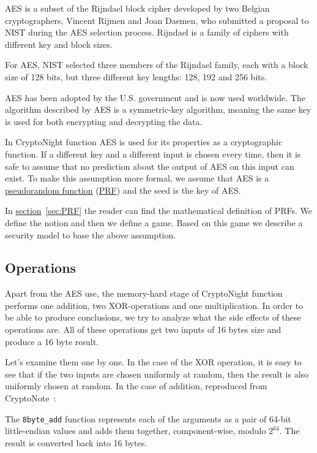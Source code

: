 AES is a subset of the Rijndael block cipher developed by two Belgian cryptographers, Vincent Rijmen and Joan Daemen, who submitted a proposal to NIST during the AES selection process. Rijndael is a family of ciphers with different key and block sizes.

For AES, NIST selected three members of the Rijndael family, each with a block size of 128 bits, but three different key lengths: 128, 192 and 256 bits.

AES has been adopted by the U.S. government and is now used worldwide. The algorithm described by AES is a symmetric-key algorithm, meaning the same key is used for both encrypting and decrypting the data.

In CryptoNight function AES is used for its properties as a cryptographic function. If a different key and a different input is chosen every time, then it is safe to assume that no prediction about the output of AES on this input can exist. To make this assumption more formal, we assume that AES is a \hyperref[sec:PRF]{pseudorandom function} (\hyperref[sec:PRF]{PRF}) and the seed is the key of AES.

In \hyperref[sec:PRF]{section}~\ref{sec:PRF} the reader can find the mathematical definition of PRFs. We define the notion and then we define a game. Based on this game we describe a security model to base the above assumption.

\subsection{Operations} \label{sec:operations}
Apart from the AES use, the memory-hard stage of CryptoNight function performs one addition, two XOR-operations and one multiplication. In order to be able to produce conclusions, we try to analyze what the side effects of these operations are. All of these operations get two inputs of 16 bytes size and produce a 16 byte result.

Let's examine them one by one. In the case of the XOR operation, it is easy to see that if the two inputs are chosen uniformly at random, then the result is also uniformly chosen at random. In the case of addition, reproduced from CryptoNote~\cite{cryptonight}:
\begin{quoting}
   The \verb|8byte_add| function represents each of the arguments as a
   pair of 64-bit little-endian values and adds them together,
   component-wise, modulo $2^{64}$. The result is converted back into
   16 bytes.
\end{quoting}

